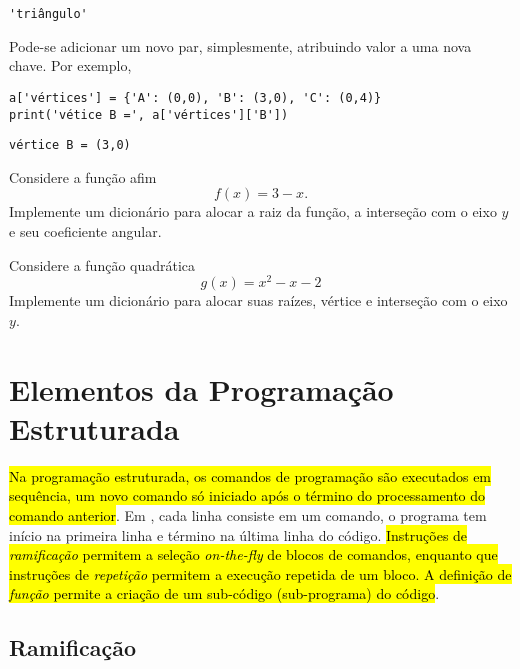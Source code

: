 \documentclass[a4paper,10pt,twoside]{article}
\begin{document}
\begin{verbatim}
'triângulo'
\end{verbatim}

Pode-se adicionar um novo par, simplesmente, atribuindo valor a uma nova chave. Por exemplo,

\begin{lstlisting}
a['vértices'] = {'A': (0,0), 'B': (3,0), 'C': (0,4)}
print('vétice B =', a['vértices']['B'])
\end{lstlisting}

\begin{verbatim}
vértice B = (3,0)
\end{verbatim}


\begin{exr}
  Considere a função afim
  \begin{equation}
    f(x) = 3 - x.
  \end{equation}
  Implemente um dicionário para alocar a raiz da função, a interseção com o eixo $y$ e seu coeficiente angular.
\end{exr}

\begin{exr}
  Considere a função quadrática
  \begin{equation}
    g(x) = x^2 - x - 2
  \end{equation}
  Implemente um dicionário para alocar suas raízes, vértice e interseção com o eixo $y$.
\end{exr}


\section{Elementos da Programação Estruturada}\label{sec_progest}

\hl{Na programação estruturada, os comandos de programação são executados em sequência, um novo comando só iniciado após o término do processamento do comando anterior}. Em {\python}, cada linha consiste em um comando, o programa tem início na primeira linha e término na última linha do código. \hl{Instruções de \emph{ramificação} permitem a seleção \textit{on-the-fly} de blocos de comandos, enquanto que instruções de \emph{repetição} permitem a execução repetida de um bloco. A definição de \emph{função} permite a criação de um sub-código (sub-programa) do código}.

\subsection{Ramificação}
\end{document}
